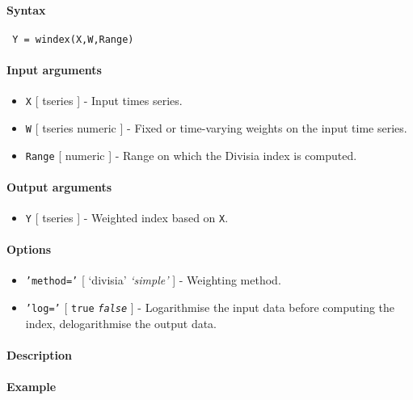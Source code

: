 


	\paragraph{Syntax}
 
 \begin{verbatim}
 Y = windex(X,W,Range)
 \end{verbatim}
 
 \paragraph{Input arguments}
 
 \begin{itemize}
 \item
   \texttt{X} {[} tseries {]} - Input times series.
 \item
   \texttt{W} {[} tseries \textbar{} numeric {]} - Fixed or time-varying
   weights on the input time series.
 \item
   \texttt{Range} {[} numeric {]} - Range on which the Divisia index is
   computed.
 \end{itemize}
 
 \paragraph{Output arguments}
 
 \begin{itemize}
 \item
   \texttt{Y} {[} tseries {]} - Weighted index based on \texttt{X}.
 \end{itemize}
 
 \paragraph{Options}
 
 \begin{itemize}
 \item
   \texttt{'method='} {[} `divisia' \textbar{} \emph{`simple'} {]} -
   Weighting method.
 \item
   \texttt{'log='} {[} \texttt{true} \textbar{} \emph{\texttt{false}} {]}
   - Logarithmise the input data before computing the index,
   delogarithmise the output data.
 \end{itemize}
 
 \paragraph{Description}
 
 \paragraph{Example}


